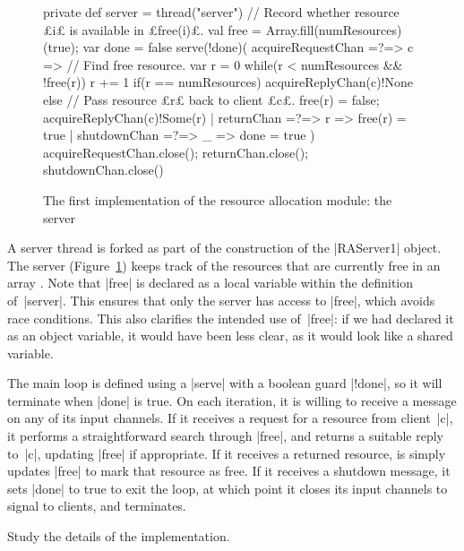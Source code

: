 \begin{figure}
\begin{scala}
  private def server = thread("server"){
    // Record whether resource £i£ is available in £free(i)£.
    val free = Array.fill(numResources)(true); var done = false
    serve(!done)(
      acquireRequestChan =?=> { c => 
	// Find free resource.
	var r = 0
	while(r < numResources && !free(r)) r += 1
	if(r == numResources) acquireReplyChan(c)!None
        else{  // Pass resource £r£ back to client £c£.
	  free(r) = false; acquireReplyChan(c)!Some(r)
        }
      }
      | returnChan =?=> { r => free(r) = true }
      | shutdownChan =?=> { _ => done = true }
    )
    acquireRequestChan.close(); returnChan.close(); shutdownChan.close()
  }
\end{scala}
\caption{The first implementation of the resource allocation module: the
  server}
\label{fig:RAServer1-2}
\end{figure}


A server thread is forked as part of the construction of the |RAServer1|
object. 
The server (Figure~\ref{fig:RAServer1-2}) keeps track of the resources that are
currently free in an array .  Note that |free| is declared as a
local variable within the definition of~|server|.  This ensures that only the
server has access to |free|, which avoids race conditions. This also clarifies
the intended use of~|free|: if we had declared it as an object variable, it
would have been less clear, as it would look like a shared variable.

The main loop is defined using a |serve| with a boolean guard |!done|, so it
will terminate when |done| is true.  On each iteration, it is willing to
receive a message on any of its input channels.  If it receives a request for
a resource from client~|c|, it performs a straightforward search through
|free|, and returns a suitable reply to~|c|, updating |free| if appropriate.
If it receives a returned resource, is simply updates |free| to mark that
resource as free.  If it receives a shutdown message, it sets |done| to true
to exit the loop, at which point it closes its input channels to signal to
clients, and terminates.

\begin{instruction}
Study the details of the implementation. 
\end{instruction}

